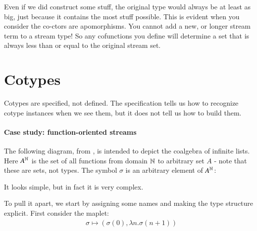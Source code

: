 Even if we did construct some stuff, the original type would always be
at least as big, just because it contains the most stuff possible.
This is evident when you consider the co-ctors are apomorphisms. You
cannot add a new, or longer stream term to a stream type! So any
cofunctions you define will determine a set that is always less than
or equal to the original stream set.


\section{Cotypes}

Cotypes are specified, not defined. The specification tells us how to
recognize cotype instances when we see them, but it does not tell us
how to build them.

\paragraph{Case study: function-oriented streams}

The following diagram, from \cite{jacobs_intro_coalgebra}, is intended
to depict the coalgebra of infinite lists. Here \(A^{\mathbb{N}}\) is
the set of all functions from domain \(\mathbb{N}\) to arbitrary set \(A\) -
note that these are sets, not types. The symbol \(\sigma\) is an
arbitrary element of \(A^{\mathbb{N}}\):

%

It looks simple, but in fact it is very complex.

To pull it apart, we start by assigning some names and making the type
structure explicit. First consider the maplet:
\begin{align}
  & \sigma\mapsto (\sigma(0), \lambda{}n.\sigma(n+1))\label{sigmap}
\end{align}

